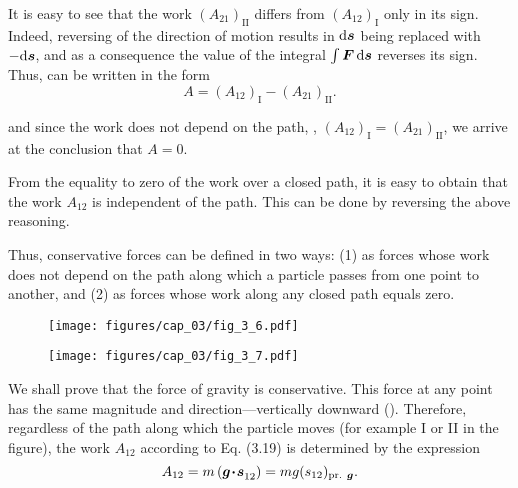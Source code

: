 \noindent
It is easy to see that the work $(A_{21})_{\text{II}}$ differs from $(A_{12})_{\text{I}}$ only in its sign. Indeed, reversing of the direction of motion results in $\mathrm{d}\boldsymbol{s}$ being replaced with $-\mathrm{d}\boldsymbol{s}$, and as a consequence the value of the integral $\int\boldsymbol{F}\,\mathrm{d}\boldsymbol{s}$ reverses its sign. Thus,  can be written in the form
\begin{equation*}
A = (A_{12})_{\text{I}} - (A_{21})_{\text{II}}.
\end{equation*}

\noindent
and since the work does not depend on the path, \ie, $(A_{12})_{\text{I}}=(A_{21})_{\text{II}}$, we arrive at the conclusion that $A=0$.

From the equality to zero of the work over a closed path, it is easy to obtain that the work $A_{12}$ is independent of the path. This can be done by reversing the above reasoning.

Thus, conservative forces can be defined in two ways: (1) as forces whose work does not depend on the path along which a particle passes from one point to another, and (2) as forces whose work along any closed path equals zero.

\begin{figure}[t]
	\begin{minipage}[t]{0.5\linewidth}
		\begin{center}
			\texttt{[image: figures/cap\_03/fig\_3\_6.pdf]}
			\caption[]{}
			\label{fig:3_6}
		\end{center}
	\end{minipage}
	\hspace{-0.05cm}
	\begin{minipage}[t]{0.5\linewidth}
		\begin{center}
			\texttt{[image: figures/cap\_03/fig\_3\_7.pdf]}
			\caption[]{}
			\label{fig:3_7}
		\end{center}
	\end{minipage}
	\vspace{-0.3cm}
\end{figure}

We shall prove that the force of gravity is conservative. This force at any point has the same magnitude and direction---vertically downward (). Therefore, regardless of the path along which the particle moves (for example I or II in the figure), the work $A_{12}$ according to Eq. (3.19) is determined by the expression
\begin{equation*}
A_{12} = m\,(\boldsymbol{g\!\cdot\!s}_{12}) = mg(s_{12})_{\text{pr. }\boldsymbol{g}}.
\end{equation*}

